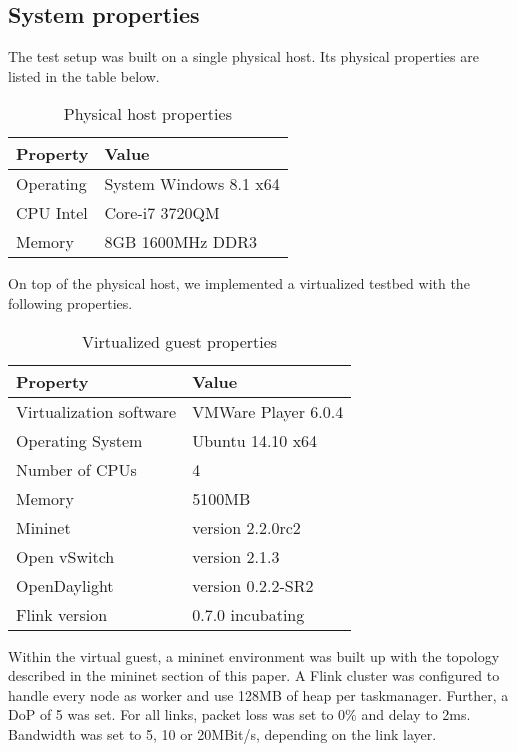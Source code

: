 \subsection{System properties}
The test setup was built on a single physical host. Its physical properties are listed in the table
below.

\begin{table}[h]
    \centering
    \begin{tabular}{| l | l | }
        \hline
        \textbf{Property} & \textbf{Value} \\ \hline
        Operating &  System Windows 8.1 x64 \\ \hline
        CPU Intel & Core-i7 3720QM \\ \hline
        Memory & 8GB 1600MHz DDR3 \\ \hline
    \end{tabular}
    \caption{Physical host properties}
    \label{table:host_properties}
\end{table}

On top of the physical host, we implemented a virtualized testbed with the following properties.

\begin{table}[h]
    \centering
    \begin{tabular}{| l | l | }
        \hline
        \textbf{Property} & \textbf{Value} \\ \hline
        Virtualization software & VMWare Player 6.0.4 \\ \hline
        Operating System & Ubuntu 14.10 x64 \\ \hline
        Number of CPUs & 4 \\ \hline
        Memory & 5100MB \\ \hline
        Mininet & version 2.2.0rc2 \\ \hline
        Open vSwitch & version 2.1.3 \\ \hline
        OpenDaylight & version 0.2.2-SR2 \\ \hline
        Flink version & 0.7.0 incubating \\ \hline
    \end{tabular}
    \caption{Virtualized guest properties}
    \label{table:guest_properties}
\end{table}

Within the virtual guest, a mininet environment was built up with the topology described in the
mininet section of this paper. A Flink cluster was configured to handle every node as worker and use
128MB of heap per taskmanager. Further, a DoP of 5 was set. For all links, packet loss was set to 0\%
and delay to 2ms. Bandwidth was set to 5, 10 or 20MBit/s, depending on the link layer.

